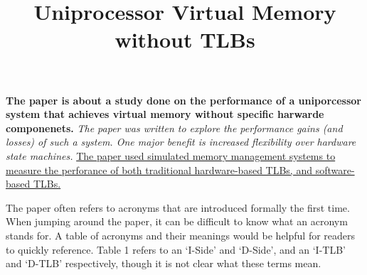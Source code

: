 \documentclass{article}
\title{Uniprocessor Virtual Memory without TLBs}
\begin{document}
\maketitle
\textbf{The paper is about a study done on the performance of a uniporcessor system that
achieves virtual memory without specific harwarde componenets.}
\textit{The paper was written to explore the performance gains (and losses) of such a system.
One major benefit is increased flexibility over hardware state machines.}
\ul{The paper used simulated memory management systems to measure the perforance of both traditional hardware-based TLBs, and software-based TLBs.}

The paper often refers to acronyms that are introduced formally the first time.
When jumping around the paper, it can be difficult to know what an acronym stands for.
A table of acronyms and their meanings would be helpful for readers to quickly reference.
Table 1 refers to an `I-Side' and `D-Side', and an `I-TLB' and `D-TLB' respectively,
though it is not clear what these terms mean.
\end{document}
